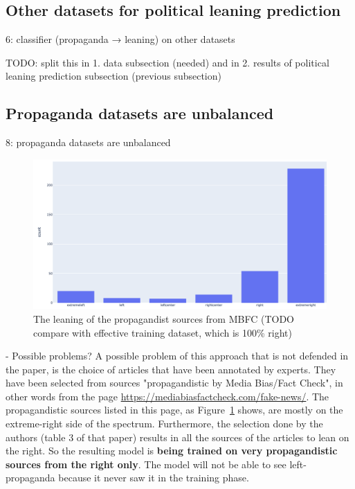

\subsection{Other datasets for political leaning prediction}
6: classifier (propaganda → leaning) on other datasets

TODO: split this in 
1. data subsection (needed) and in
2. results of political leaning prediction subsection (previous subsection)

\subsection{Propaganda datasets are unbalanced}

8: propaganda datasets are unbalanced

\begin{figure}[!htb]
   \centering
   \includegraphics[width=\linewidth]{figures/leaning_questionable.png}
   \caption{The leaning of the propagandist sources from MBFC (TODO compare with effective training dataset, which is 100\% right)}
   \label{fig:mbfc_leaning}
\end{figure}

- Possible problems?
A possible problem of this approach that is not defended in the paper, is the choice of articles that have been annotated by experts. They have been selected from sources "propagandistic by Media Bias/Fact Check", in other words from the page \url{https://mediabiasfactcheck.com/fake-news/}. The propagandistic sources listed in this page, as Figure~\ref{fig:mbfc_leaning} shows, are mostly on the extreme-right side of the spectrum. Furthermore, the selection done by the authors (table 3 of that paper) results in all the sources of the articles to lean on the right.
So the resulting model is \textbf{being trained on very propagandistic sources from the right only}. The model will not be able to see left-propaganda because it never saw it in the training phase.



